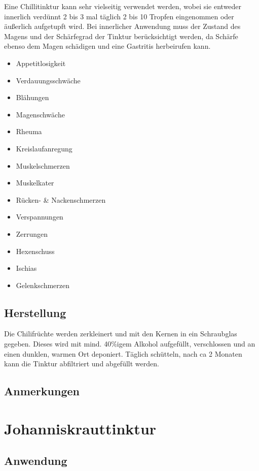 Eine Chillitinktur kann sehr vielseitig verwendet werden, wobei sie entweder innerlich verdünnt 2 bis 3  mal täglich 2 bis 10 Tropfen eingenommen oder äußerlich aufgetupft wird. Bei innerlicher Anwendung muss der Zustand des Magens und der Schärfegrad der Tinktur berücksichtigt werden, da Schärfe ebenso dem Magen schädigen und eine Gastritis herbeirufen kann. 

\begin{itemize}
	\item Appetitlosigkeit
	\item Verdauungsschwäche
	\item Blähungen
	\item Magenschwäche
	\item Rheuma
	\item Kreislaufanregung
	\item Muskelschmerzen
	\item Muskelkater
	\item Rücken- \& Nackenschmerzen
	\item Verspannungen
	\item Zerrungen
	\item Hexenschuss
	\item Ischias
	\item Gelenkschmerzen
\end{itemize}

\subsection{Herstellung}

Die Chilifrüchte werden zerkleinert und mit den Kernen in ein Schraubglas gegeben. Dieses wird mit mind. 40\%igem Alkohol aufgefüllt, verschlossen und an einen dunklen, warmen Ort deponiert. Täglich schütteln, nach ca 2 Monaten kann die Tinktur abfiltriert und abgefüllt werden.

\subsection{Anmerkungen}






\section{Johanniskrauttinktur}

\subsection{Anwendung}

